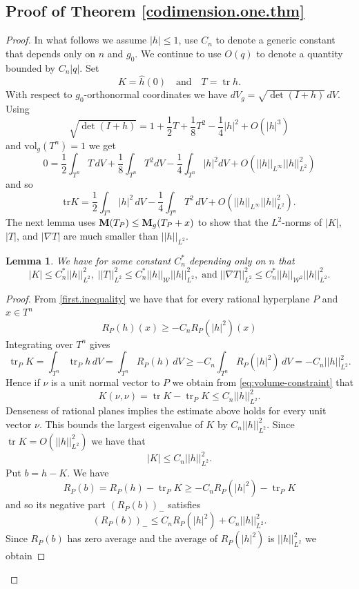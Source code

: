 \documentclass[11pt]{amsart}
\def\tr{\operatorname{tr}}
\def\vol{\mathrm{vol}}
\newtheorem{lemm}[thm]{Lemma}
\theoremstyle{remark}
\theoremstyle{definition}
\begin{document}
	
	
	
	\subsection{Proof of Theorem \ref{codimension.one.thm}}
	\begin{proof}
		In what follows we assume $|h|\leq 1$, use  $C_n$ to denote a generic constant that depends only on $n$ {and $g_0$. We continue to use $O(q)$ to denote a quantity bounded by $C_n|q|$.} Set
		$$
		K=\widehat h(0)\quad\text{and}\quad T=\tr h.
		$$
		With respect to $g_0$-orthonormal coordinates we have
		$
		dV_g=\sqrt{\det(I+h)}\,dV.
		$
		Using
		$$
		\sqrt{\det(I+h)} =1+\frac12T+\frac18T^2-\frac14|h|^2+O(|h|^3)
		$$
		{and $\vol_g(T^n)=1$ we get
			$$
			0=\frac12\int_{T^n}T\,dV+\frac18\int_{T^n}T^2dV-\frac14\int_{T^n}|h|^2dV+O(||h||_{L^{\infty}}||h||_{L^2}^2)
			$$}
		and so
		\begin{equation}\label{eq:volume-constraint}
			\text {tr}K=\frac12\int_{T^n}|h|^2\,dV-\frac14\int_{T^n}T^2\,dV+O(||h||_{L^{\infty}}||h||_{L^2}^2).
		\end{equation}
		{The next lemma uses  ${\bf M}(T_P)\leq{\bf M}_g(T_P+x)$ to show that the $L^2$-norms of $|K|$, $|T|$, and $|\nabla T|$ are much smaller than $||h||_{L^2}$.}
		\begin{lemm}\label{first.estimates}
			We have for some constant $C_n^*$ depending only on $n$ that
			$$|K|\leq C^*_n||h||^2_{L^2},\; ||T||_{L^2}^2\leq C^*_n||h||_{\mathcal W}||h||^2_{L^2},\;\text{and}\; ||\nabla T||_{L^2}^2\leq C^*_n||h||_{\mathcal W^2}||h||^2_{L^2}.$$
		\end{lemm}
		\begin{proof}
			From \eqref{first.inequality}  we have that for every rational hyperplane $P$ and $x\in T^n$
			$$
			R_P(h)(x)\geq-C_nR_P(|h|^2)(x)
			$$
			Integrating over $T^n$ {gives
				$$\tr _PK=\int_{T^n}\tr_Ph\,dV=\int_{T^n}R_P(h)\,dV\geq -C_n\int_{T^n}R_P(|h|^2)\,dV=-C_n||h||^2_{L^2}.$$
			} Hence if $\nu$ is a unit normal vector to $P$ we obtain from \eqref{eq:volume-constraint} that
			$$K(\nu,\nu)=\tr K- \tr _PK\leq C_n||h||^2_{L^2}.$$
			Denseness of rational planes implies the estimate above holds for every unit vector $\nu$. This bounds the largest eigenvalue of $K$ by $C_n||h||^2_{L^2}$. Since $\tr K=O(||h||^2_{L^2})$ we have that
			$$|K|\leq C_n||h||^2_{L^2}.$$ 
			Put $b=h-K$. We have 
			$$R_P(b)=R_P(h)-\tr _PK\geq -C_nR_P(|h|^2)-\tr _PK$$ 
			and so its negative part $(R_P(b))_-$ satisfies
			$$(R_P(b))_-\leq C_nR_P(|h|^2)+C_n||h||^2_{L^2}.$$
			Since $R_P(b)$ has zero average  and the average of $R_P(|h|^2)$ is $||h||^2_{L^2}$ we obtain

\end{proof}
\end{proof}
\end{document}
